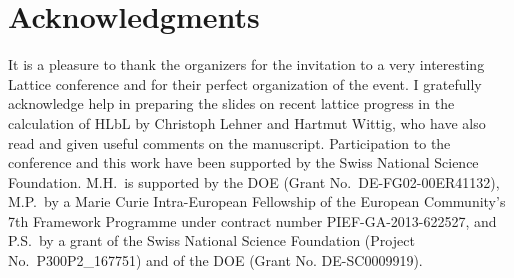 \documentclass[epj]{webofc}
\newcommand{\<}{\langle}
\renewcommand{\>}{\rangle}
\begin{document}
\section*{Acknowledgments}
It is a pleasure to thank the organizers for the invitation to a
very interesting Lattice conference and for their perfect
organization of the event. I gratefully acknowledge help in preparing the
slides on recent lattice progress in the calculation of HLbL by Christoph
Lehner and Hartmut Wittig, who have also read and given useful comments on the
manuscript. Participation to the conference and this work have been
supported by the Swiss National Science Foundation. M.H.\ is supported by
the DOE (Grant No.\ DE-FG02-00ER41132), M.P.\ by a Marie Curie
Intra-European Fellowship of the European Community's 7th Framework
Programme under contract number PIEF-GA-2013-622527, and P.S.\ by a grant
of the Swiss National Science Foundation (Project No.\ P300P2\_167751) and
of the DOE (Grant No. DE-SC0009919). 

\clearpage

\end{document}
